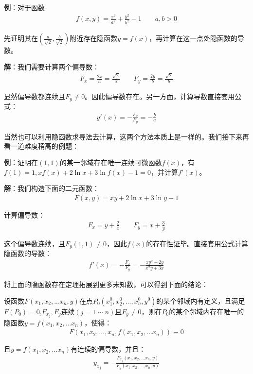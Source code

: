 \documentclass{ctexart}
\let\oldtextbf\textbf %
\renewcommand{\textbf}[1]{\textcolor{btex}{\oldtextbf{#1}}} %
\begin{document}
\textbf{例}：对于函数
\begin{align*}
    f(x,y)=\frac{x^2}{a^2}+\frac{y^2}{b^2}-1\qquad a,b>0
\end{align*}

先证明其在$(\frac{a}{\sqrt{2}},\frac{b}{\sqrt{2}})$附近存在隐函数$y=f(x)$，再计算在这一点处隐函数的导数。

\textbf{解}：我们需要计算两个偏导数：
\begin{align*}
    F_x=\frac{2x}{a}=\frac{\sqrt{2}}{a}\qquad F_y=\frac{2y}{b}=\frac{\sqrt{2}}{b}
\end{align*}

显然偏导数都连续且$F_y\neq 0$。因此偏导数存在。另一方面，计算导数直接套用公式：
\begin{align*}
    y'(x)=-\frac{F_x}{F_y}=-\frac{b}{a}
\end{align*}

当然也可以利用隐函数求导法去计算，这两个方法本质上是一样的。我们接下来再看一道难度稍高的例题：

\textbf{例}：证明在$(1,1)$的某一邻域存在唯一连续可微函数$f(x)$，有$f(1)=1,xf(x)+2\ln x+3\ln f(x)-1=0$，并计算$f'(x)$。

\textbf{解}：我们构造下面的二元函数：
\begin{align*}
    F(x,y)=xy+2\ln x+3\ln y-1
\end{align*}

计算偏导数：
\begin{align*}
    F_x=y+\frac{2}{x}\qquad F_y=x+\frac{3}{y}
\end{align*}

这个偏导数连续，且$F_y(1,1)\neq 0$，因此$f(x)$的存在性证毕。直接套用公式计算隐函数的导数：
\begin{align*}
    f'(x)=-\frac{F_x}{F_y}=-\frac{xy^2+2y}{x^2y+3x}
\end{align*}

将上面的隐函数存在定理拓展到更多未知数，可以得到下面的结论：
\begin{tcolorbox}[
    colback=bac1,     %
    colframe=fra1,   %
    coltitle=white,             %
    coltext=tex1,
    title=隐函数存在定理（1方程，n+1未知数）,
    fonttitle=\bfseries,        %
arc=3mm,                     %
breakable
]
设函数$F(x_1,x_2,...x_n,y)$在点$P_0(x_1^0,x_2^0,...,x_n^0,y^0)$的某个邻域内有定义，且满足$F(P_0)=0$,$F_{x_j},F_y$连续$(j=1\sim n)$且$F_y\neq 0$，则在$P_0$的某个邻域内存在唯一的隐函数$y=f(x_1,x_2,...x_n)$，使得：
\begin{align*}
    F(x_1,x_2,...,x_n,f(x_1,x_2,...x_n))\equiv 0
\end{align*}

且$y=f(x_1,x_2,...x_n)$有连续的偏导数，并且：
\begin{align*}
    y_{x_j}=-\frac{F_{x_j}(x_1,x_2,...x_n,y)}{F_y(x_1,x_2,...,x_n,y)}\tag{7-15}
\end{align*}
\end{tcolorbox}
\end{document}
